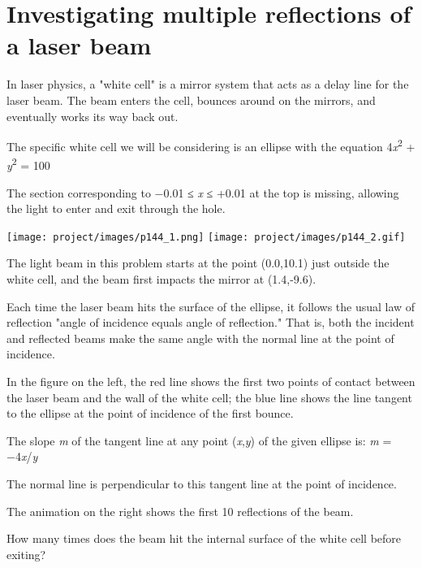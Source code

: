 \section[Problem \#144: Investigating multiple reflections of a laser beam]{Investigating multiple reflections of a laser beam}
\label{sec:problem_144}

In laser physics, a "white cell" is a mirror system that acts as a delay
line for the laser beam. The beam enters the cell, bounces around on the
mirrors, and eventually works its way back out.

The specific white cell we will be considering is an ellipse with the
equation 4\emph{x}\textsuperscript{2} + \emph{y}\textsuperscript{2} =
100

The section corresponding to −0.01 ≤ \emph{x} ≤ +0.01 at the top is
missing, allowing the light to enter and exit through the hole.

\begin{center}
\texttt{[image: project/images/p144\_1.png]}\quad{}
\texttt{[image: project/images/p144\_2.gif]}
\end{center}

The light beam in this problem starts at the point (0.0,10.1) just
outside the white cell, and the beam first impacts the mirror at
(1.4,-9.6).

Each time the laser beam hits the surface of the ellipse, it follows the
usual law of reflection "angle of incidence equals angle of reflection."
That is, both the incident and reflected beams make the same angle with
the normal line at the point of incidence.

In the figure on the left, the red line shows the first two points of
contact between the laser beam and the wall of the white cell; the blue
line shows the line tangent to the ellipse at the point of incidence of
the first bounce.

The slope \emph{m} of the tangent line at any point (\emph{x},\emph{y})
of the given ellipse is: \emph{m} = −4\emph{x}/\emph{y}

The normal line is perpendicular to this tangent line at the point of
incidence.

The animation on the right shows the first 10 reflections of the beam.

How many times does the beam hit the internal surface of the white cell
before exiting?